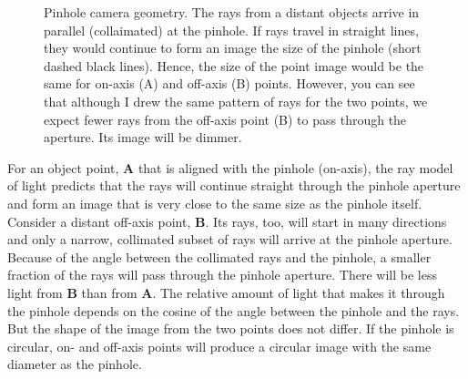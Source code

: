 \documentclass[
  letterpaper,
]{book}
\begin{document}
\begin{figure}


\caption{\label{fig-pinhole-distant}Pinhole camera geometry. The rays
from a distant objects arrive in parallel (collaimated) at the pinhole.
If rays travel in straight lines, they would continue to form an image
the size of the pinhole (short dashed black lines). Hence, the size of
the point image would be the same for on-axis (A) and off-axis (B)
points. However, you can see that although I drew the same pattern of
rays for the two points, we expect fewer rays from the off-axis point
(B) to pass through the aperture. Its image will be dimmer.}

\end{figure}%

For an object point, \textbf{A} that is aligned with the pinhole
(on-axis), the ray model of light predicts that the rays will continue
straight through the pinhole aperture and form an image that is very
close to the same size as the pinhole itself. Consider a distant
off-axis point, \textbf{B}. Its rays, too, will start in many directions
and only a narrow, collimated subset of rays will arrive at the pinhole
aperture. Because of the angle between the collimated rays and the
pinhole, a smaller fraction of the rays will pass through the pinhole
aperture. There will be less light from \textbf{B} than from \textbf{A}.
The relative amount of light that makes it through the pinhole depends
on the cosine of the angle between the pinhole and the rays. But the
shape of the image from the two points does not differ. If the pinhole
is circular, on- and off-axis points will produce a circular image with
the same diameter as the pinhole.
\end{document}
